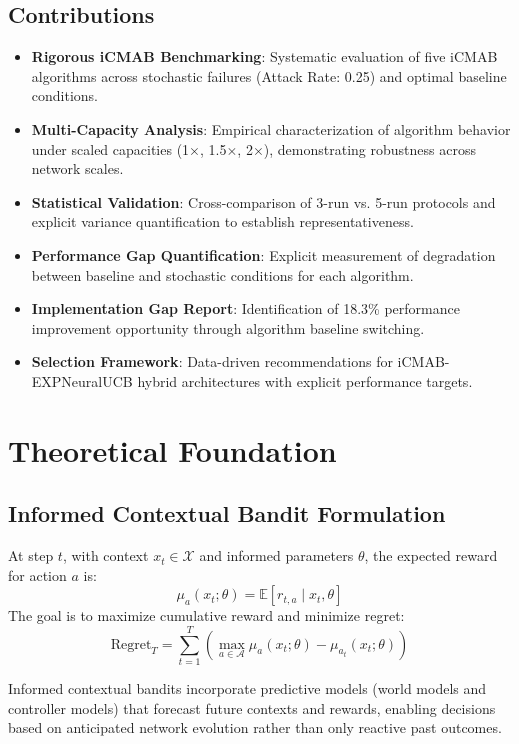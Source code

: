 \documentclass[12pt,a4paper]{article}
\begin{document}
\subsection{Contributions}
\begin{itemize}
\item \textbf{Rigorous iCMAB Benchmarking}: Systematic evaluation of five iCMAB algorithms across stochastic failures (Attack Rate: 0.25) and optimal baseline conditions.
\item \textbf{Multi-Capacity Analysis}: Empirical characterization of algorithm behavior under scaled capacities (1$\times$, 1.5$\times$, 2$\times$), demonstrating robustness across network scales.
\item \textbf{Statistical Validation}: Cross-comparison of 3-run vs. 5-run protocols and explicit variance quantification to establish representativeness.
\item \textbf{Performance Gap Quantification}: Explicit measurement of degradation between baseline and stochastic conditions for each algorithm.
\item \textbf{Implementation Gap Report}: Identification of 18.3\% performance improvement opportunity through algorithm baseline switching.
\item \textbf{Selection Framework}: Data-driven recommendations for iCMAB-EXPNeuralUCB hybrid architectures with explicit performance targets.
\end{itemize}

\section{Theoretical Foundation}

\subsection{Informed Contextual Bandit Formulation}
At step $t$, with context $x_t \in \mathcal{X}$ and informed parameters $\theta$, the expected reward for action $a$ is:
\[
\mu_a(x_t; \theta) = \mathbb{E}[r_{t,a} \mid x_t, \theta]
\]
The goal is to maximize cumulative reward and minimize regret:
\[
\mathrm{Regret}_T = \sum_{t=1}^{T}\left(\max_{a \in \mathcal{A}} \mu_a(x_t;\theta) - \mu_{a_t}(x_t;\theta)\right)
\]

Informed contextual bandits incorporate predictive models (world models and controller models) that forecast future contexts and rewards, enabling decisions based on anticipated network evolution rather than only reactive past outcomes.
\end{document}
